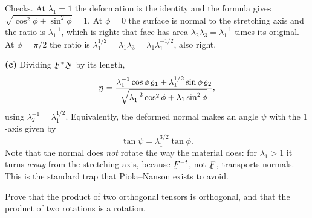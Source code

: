\begin{solution}
Checks. At $\lambda_{1}=1$ the deformation is the identity and the formula
gives $\sqrt{\cos^{2}\phi+\sin^{2}\phi}=1$. At $\phi=0$ the surface is
normal to the stretching axis and the ratio is $\lambda_{1}^{-1}$, which
is right: that face has area $\lambda_{2}\lambda_{3}=\lambda_{1}^{-1}$
times its original. At $\phi=\pi/2$ the ratio is $\lambda_{1}^{1/2}
=\lambda_{1}\lambda_{3}=\lambda_{1}\lambda_{1}^{-1/2}$, also right.

\textbf{(c)} Dividing $\bF^{*}\bN$ by its length,
\[
   \bn=\frac{\lambda_{1}^{-1}\cos\phi\,\be_{1}
             +\lambda_{1}^{1/2}\sin\phi\,\be_{2}}
            {\sqrt{\lambda_{1}^{-2}\cos^{2}\phi+\lambda_{1}\sin^{2}\phi}},
\]
using $\lambda_{2}^{-1}=\lambda_{1}^{1/2}$. Equivalently, the deformed
normal makes an angle $\psi$ with the $1$-axis given by
\[
   \tan\psi=\lambda_{1}^{3/2}\tan\phi .
\]
Note that the normal does \emph{not} rotate the way the material does: for
$\lambda_{1}>1$ it turns \emph{away} from the stretching axis, because
$\bF^{-t}$, not $\bF$, transports normals. This is the standard trap that
Piola--Nanson exists to avoid.
\end{solution}

\begin{problem}
Prove that the product of two orthogonal tensors is orthogonal, and that
the product of two rotations is a rotation.
\end{problem}

